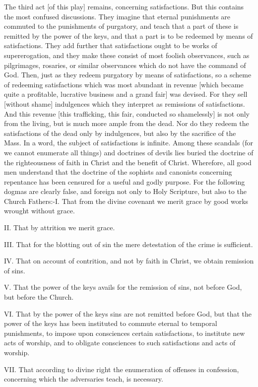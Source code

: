 The third act [of this play] remains, concerning satisfactions.  But
this contains the most confused discussions.  They imagine that
eternal punishments are commuted to the punishments of purgatory, and
teach that a part of these is remitted by the power of the keys, and
that a part is to be redeemed by means of satisfactions.  They add
further that satisfactions ought to be works of supererogation, and
they make these consist of most foolish observances, such as
pilgrimages, rosaries, or similar observances which do not have the
command of God.  Then, just as they redeem purgatory by means of
satisfactions, so a scheme of redeeming satisfactions which was most
abundant in revenue [which became quite a profitable, lucrative
business and a grand fair] was devised.  For they sell [without
shame] indulgences which they interpret as remissions of
satisfactions.  And this revenue [this trafficking, this fair,
conducted so shamelessly] is not only from the living, but is much
more ample from the dead.  Nor do they redeem the satisfactions of
the dead only by indulgences, but also by the sacrifice of the Mass.
In a word, the subject of satisfactions is infinite.  Among these
scandals (for we cannot enumerate all things) and doctrines of devils
lies buried the doctrine of the righteousness of faith in Christ and
the benefit of Christ.  Wherefore, all good men understand that the
doctrine of the sophists and canonists concerning repentance has been
censured for a useful and godly purpose.  For the following dogmas
are clearly false, and foreign not only to Holy Scripture, but also
to the Church Fathers:-I. That from the divine covenant we merit
grace by good works wrought without grace.

II. That by attrition we merit grace.

III. That for the blotting out of sin the mere detestation of the
crime is sufficient.

IV. That on account of contrition, and not by faith in Christ, we
obtain remission of sins.

V. That the power of the keys avails for the remission of sins, not
before God, but before the Church.

VI. That by the power of the keys sins are not remitted before God,
but that the power of the keys has been instituted to commute eternal
to temporal punishments, to impose upon consciences certain
satisfactions, to institute new acts of worship, and to obligate
consciences to such satisfactions and acts of worship.

VII. That according to divine right the enumeration of offenses in
confession, concerning which the adversaries teach, is necessary.


